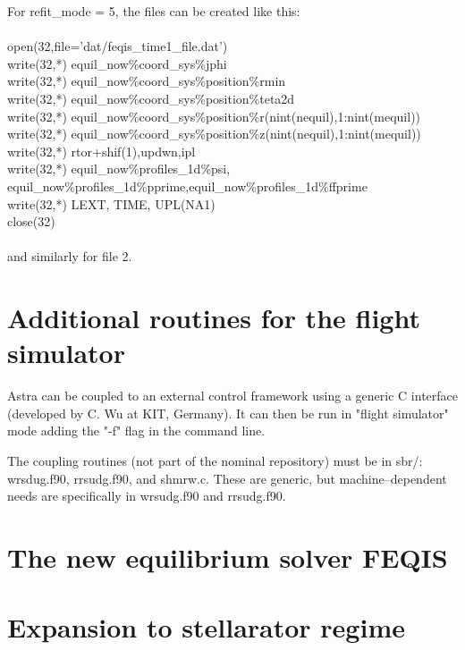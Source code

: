 \documentclass[12pt]{article}
\begin{document}
For refit\_mode = 5, the files can be created like this:\\\\
open(32,file='dat/feqis\_time1\_file.dat') \\
write(32,*) equil\_now\%coord\_sys\%jphi \\
write(32,*) equil\_now\%coord\_sys\%position\%rmin \\
write(32,*) equil\_now\%coord\_sys\%position\%teta2d \\
write(32,*) equil\_now\%coord\_sys\%position\%r(nint(nequil),1:nint(mequil)) \\
write(32,*) equil\_now\%coord\_sys\%position\%z(nint(nequil),1:nint(mequil)) \\
write(32,*) rtor+shif(1),updwn,ipl \\
write(32,*) equil\_now\%profiles\_1d\%psi,  equil\_now\%profiles\_1d\%pprime,equil\_now\%profiles\_1d\%ffprime \\
write(32,*) LEXT, TIME, UPL(NA1) \\
close(32)\\\\
and similarly for file 2.

\section{Additional routines for the flight simulator}
Astra can be coupled to an external control framework using a generic C interface (developed by C. Wu at KIT, Germany). It can then be run in "flight simulator" mode adding the "-f" flag in the command line.

The coupling routines (not part of the nominal repository) must be in sbr/: wrsdug.f90, rrsudg.f90, and shmrw.c. These are generic, but machine--dependent needs are specifically in wrsudg.f90 and rrsudg.f90.

\section{The new equilibrium solver FEQIS}
	

\section{Expansion to stellarator regime}

\end{document}
